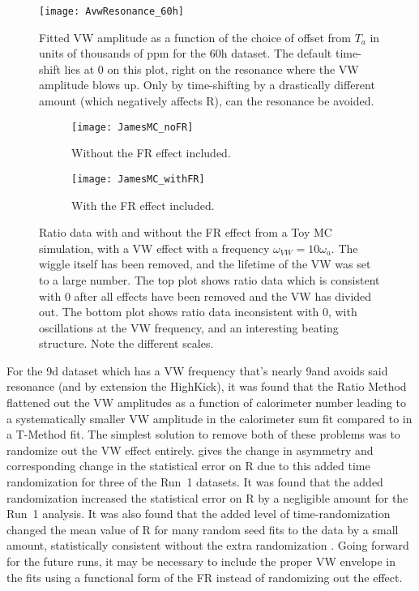 \begin{figure}
    \centering
    \texttt{[image: AvwResonance\_60h]}
    \caption[VW amplitude resonance in the 60h dataset]{Fitted VW amplitude as a function of the choice of  offset from $T_{a}$ in units of thousands of ppm for the 60h dataset. The default time-shift lies at 0 on this plot, right on the resonance where the VW amplitude blows up. Only by time-shifting by a drastically different amount (which negatively affects R), can the resonance be avoided.}
    \label{fig:VWresonance}
\end{figure}


\begin{figure}
\centering
    \begin{subfigure}[t]{0.6\textwidth}
        \centering
        \texttt{[image: JamesMC\_noFR]}
        \caption{Without the FR effect included.}
    \end{subfigure}%

    \begin{subfigure}[t]{0.6\textwidth}
        \centering
        \texttt{[image: JamesMC\_withFR]}
        \caption{With the FR effect included.}
    \end{subfigure}
\caption[VW envelope in Ratio Method Toy MC data with and without FR effect]{Ratio data with and without the FR effect from a Toy MC simulation, with a VW effect with a frequency $\omega_{VW} = 10 \omega_{a}$. The \wa wiggle itself has been removed, and the lifetime of the VW was set to a large number. The top plot shows ratio data which is consistent with 0 after all effects have been removed and the VW has divided out. The bottom plot shows ratio data inconsistent with 0, with oscillations at the VW frequency, and an interesting beating structure. Note the different scales.}
\label{fig:JamesMC_VW_FR}
\end{figure}


For the 9d dataset which has a VW frequency that's nearly 9\wa and avoids said resonance (and by extension the HighKick), it was found that the Ratio Method flattened out the VW amplitudes as a function of calorimeter number leading to a systematically smaller VW amplitude in the calorimeter sum fit compared to in a T-Method fit. The simplest solution to remove both of these problems was to randomize out the VW effect entirely.  gives the change in asymmetry and corresponding change in the statistical error on R due to this added time randomization for three of the Run~1 datasets. It was found that the added randomization increased the statistical error on R by a negligible amount for the Run~1 analysis. It was also found that the added level of time-randomization changed the mean value of R for many random seed fits to the data by a small amount, statistically consistent without the extra randomization \cite{VWinRatio}. Going forward for the future runs, it may be necessary to include the proper VW envelope in the fits using a functional form of the FR instead of randomizing out the effect.

